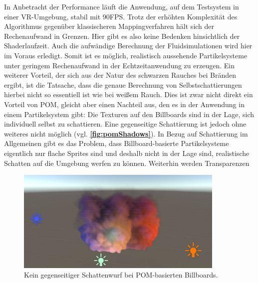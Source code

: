 In Anbetracht der Performance läuft die Anwendung, auf dem Testsystem in einer VR-Umgebung, stabil mit 90FPS. Trotz der erhöhten Komplexität des Algorithmus gegenüber klassischeren 
Mappingverfahren hält sich der Rechenaufwand in Grenzen. Hier gibt es also keine Bedenken hinsichtlich der Shaderlaufzeit. Auch die aufwändige Berechnung der Fluidsimulationen wird hier im Voraus erledigt. 
Somit ist es möglich, realistisch aussehende Partikelsysteme unter geringem Rechenaufwand in der Echtzeitanwendung zu erzeugen. Ein weiterer Vorteil, der sich aus der Natur des schwarzen 
Rauches bei Bränden ergibt, ist die Tatsache, dass die genaue Berechnung von Selbstschattierungen hierbei nicht so essentiell ist wie bei weißem Rauch. Dies ist zwar nicht direkt ein Vorteil von POM, 
gleicht aber einen Nachteil aus, den es in der Anwendung in einem Partikelsystem gibt: Die Texturen auf den Billboards sind in der Lage, sich individuell selbst zu schattieren. 
Eine gegenseitige Schattierung ist jedoch ohne weiteres nicht möglich (vgl. \textbf{\autoref{fig:pomShadows}}). 
In Bezug auf Schattierung im Allgemeinen gibt es das Problem, dass Billboard-basierte Partikelsysteme eigentlich nur flache Sprites sind und deshalb nicht in der 
Lage sind, realistische Schatten auf die Umgebung werfen zu können. Weiterhin werden Transparenzen 



\begin{figure}[h!]
	\centering
	\includegraphics[width=0.89\textwidth]{Grafiken/Evaluation/pomShadows.png}
	\begin{footnotesize}
		\caption{Kein gegenseitiger Schattenwurf bei POM-basierten Billboards. }
		\label{fig:pomShadows}
	\end{footnotesize}
\end{figure}

